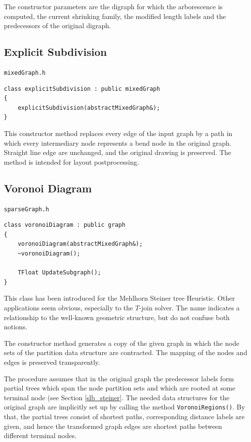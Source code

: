 \documentclass[a4paper,11pt,twoside]{book}
\begin{document}
\begin{multicols}{2}
The constructor parameters are the digraph for which the arborescence is
computed, the current shrinking family, the modified length labels and the
predecessors of the original digraph.


\subsection{Explicit Subdivision}
\myinclude\verb/mixedGraph.h/
\begin{mymethods}
\begin{verbatim}
class explicitSubdivision : public mixedGraph
{
    explicitSubdivision(abstractMixedGraph&);
}
\end{verbatim}
\end{mymethods}
This constructor method replaces every edge of the input graph by a path in
which every intermediary node represents a bend node in the original graph.
Straight line edge are unchanged, and the original drawing is preserved. The
method is intended for layout postprocessing.


\subsection{Voronoi Diagram}
\myinclude\verb/sparseGraph.h/
\begin{mymethods}
\begin{verbatim}
class voronoiDiagram : public graph
{
    voronoiDiagram(abstractMixedGraph&);
    ~voronoiDiagram();

    TFloat UpdateSubgraph();
}
\end{verbatim}
\end{mymethods}
This class has been introduced for the Mehlhorn Steiner tree Heuristic. Other
applications seem obvious, especially to the $T$-join solver. The name
indicates a relationship to the well-known geometric structure, but do not
confuse both notions.

The constructor method generates a copy of the given graph in which the node
sets of the partition data structure are contracted. The mapping of the nodes
and edges is preserved transparently.

The procedure assumes that in the original graph the predecessor labels form
partial trees which span the node partition sets and which are rooted at some
terminal node (see Section \ref{slb_steiner}. The needed data structures for
the original graph are implicitly set up by calling the method
\verb/VoronoiRegions()/. By that, the partial trees consist of shortest paths,
corresponding distance labels are given, and hence the transformed graph edges
are shortest paths between different terminal nodes.


\end{multicols}
\end{document}
